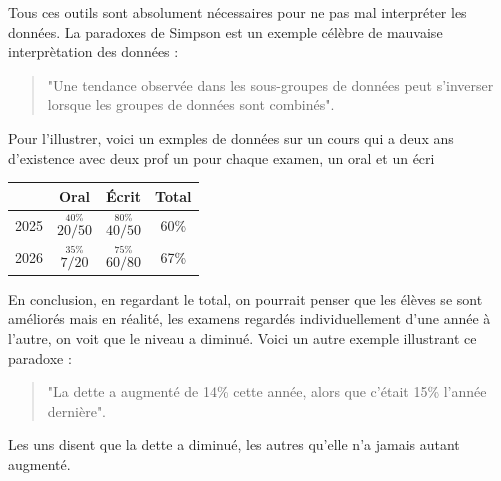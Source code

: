 \begin{remarque}
    Tous ces outils sont absolument nécessaires pour ne pas mal interpréter les données. La paradoxes de Simpson est un exemple célèbre de mauvaise interprètation des données :
    \begin{quote}
    "Une tendance observée dans les sous-groupes de données peut s'inverser lorsque les groupes de données sont combinés". 
    \end{quote}
    Pour l'illustrer, voici un exmples de données sur un cours qui a deux ans d'existence avec deux prof un pour chaque examen, un oral et un écri
    
\begin{center}
  \begin{tabular}{c|ccc}
       & Oral & Écrit & Total \\
    \hline
    2025 & $\overset{\scriptstyle 40\%}{20/50}$
         & $\overset{\scriptstyle 80\%}{40/50}$
         & 60\% \\[1.2em]
    2026 & $\overset{\scriptstyle 35\%}{7/20}$
         & $\overset{\scriptstyle 75\%}{60/80}$
         & 67\% \\
  \end{tabular}
\end{center}
En conclusion, en regardant le total, on pourrait penser que les élèves se sont améliorés mais en réalité, les examens regardés individuellement d'une année à l'autre, on voit que le niveau a diminué.
Voici un autre exemple illustrant ce paradoxe :

\begin{quote}
    "La dette a augmenté de 14\% cette année, alors que c'était 15\% l'année dernière".

\end{quote}

Les uns disent que la dette a diminué, les autres qu'elle n'a jamais autant augmenté.
\begin{center}



\end{center}
\end{remarque}
